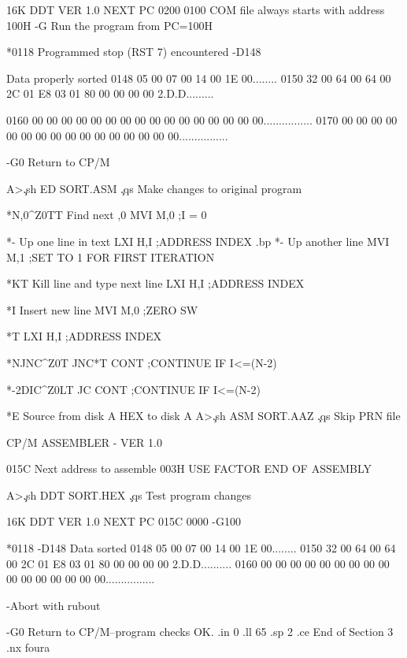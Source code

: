 16K DDT VER 1.0
NEXT PC
0200 0100    COM file always starts with address 100H
-G     Run the program from PC=100H

*0118    Programmed stop (RST 7) encountered
-D148

                              Data properly sorted
0148 05 00 07 00 14 00 1E 00........
0150 32 00 64 00 64 00 2C 01 E8 03 01 80 00 00 00 00 2.D.D.........

0160 00 00 00 00 00 00 00 00 00 00 00 00 00 00 00 00................
0170 00 00 00 00 00 00 00 00 00 00 00 00 00 00 00 00................

-G0   Return to CP/M

A>\c
.sh
ED SORT.ASM     \c
.qs
Make changes to original program

*N,0^Z0TT     Find next ,0
     MVI        M,0        ;I = 0

*-   Up one line in text
     LXI            H,I    ;ADDRESS INDEX
.bp
*-   Up another line
     MVI            M,1    ;SET TO 1 FOR FIRST ITERATION

*KT  Kill line and type next line
     LXI            H,I    ;ADDRESS INDEX

*I   Insert new line
     MVI            M,0    ;ZERO SW

*T
     LXI            H,I    ;ADDRESS INDEX

*NJNC^Z0T
    JNC*T
    CONT            ;CONTINUE IF I<=(N-2)

*-2DIC^Z0LT
    JC              CONT   ;CONTINUE IF I<=(N-2)

*E                    Source from disk A
                      HEX to disk A
A>\c
.sh
ASM SORT.AAZ        \c
.qs
Skip PRN file

CP/M ASSEMBLER - VER 1.0

015C    Next address to assemble
003H USE FACTOR
END OF ASSEMBLY

A>\c
.sh
DDT SORT.HEX        \c
.qs
Test program changes

16K DDT VER 1.0
NEXT PC
015C 0000
-G100

*0118
-D148
                          Data sorted
0148 05 00 07 00 14 00 1E 00........
0150 32 00 64 00 64 00 2C 01 E8 03 01 80 00 00 00 00 2.D.D..........
0160 00 00 00 00 00 00 00 00 00 00 00 00 00 00 00 00................

-Abort with rubout

-G0    Return to CP/M--program checks OK.
.in 0
.ll 65
.sp 2
.ce
End of Section 3
.nx foura
